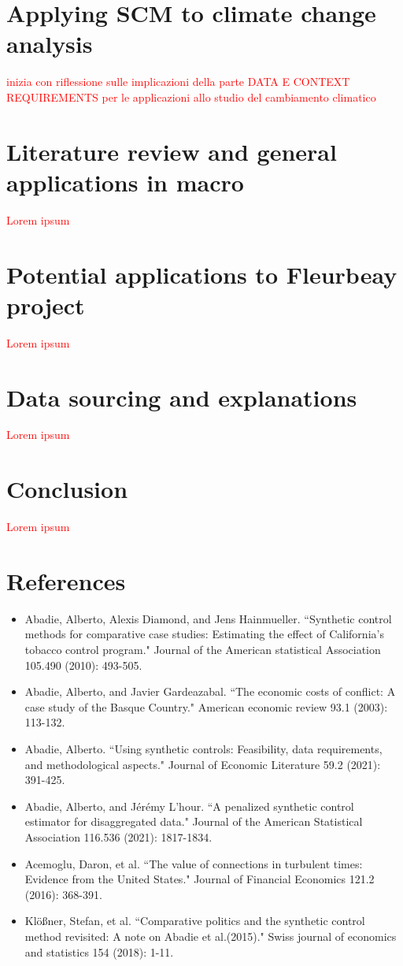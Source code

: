\documentclass[12pt,a4paper,draft]{article}
\begin{document}
\section{Applying SCM to climate change analysis}
\textcolor{red}{inizia con riflessione sulle implicazioni della parte DATA E CONTEXT
REQUIREMENTS per le applicazioni allo studio del cambiamento climatico}


\section{Literature review and general applications in macro}
\textcolor{red}{Lorem ipsum}




\section{Potential applications to Fleurbeay project}
\textcolor{red}{Lorem ipsum}




\section{Data sourcing and explanations}
\textcolor{red}{Lorem ipsum}




\section{Conclusion}
\textcolor{red}{Lorem ipsum}


\newpage
\section{References}
\begin{itemize}
    \item Abadie, Alberto, Alexis Diamond, and Jens Hainmueller. ``Synthetic control methods for comparative case studies: Estimating the effect of California's tobacco control program." Journal of the American statistical Association 105.490 (2010): 493-505.
    \item Abadie, Alberto, and Javier Gardeazabal. ``The economic costs of conflict: A case study of the Basque Country." American economic review 93.1 (2003): 113-132.
    \item Abadie, Alberto. ``Using synthetic controls: Feasibility, data requirements, and methodological aspects." Journal of Economic Literature 59.2 (2021): 391-425.
    \item Abadie, Alberto, and Jérémy L’hour. ``A penalized synthetic control estimator for disaggregated data." Journal of the American Statistical Association 116.536 (2021): 1817-1834.
    \item Acemoglu, Daron, et al. ``The value of connections in turbulent times: Evidence from the United States." Journal of Financial Economics 121.2 (2016): 368-391.
    \item Klößner, Stefan, et al. ``Comparative politics and the synthetic control method revisited: A note on Abadie et al.(2015)." Swiss journal of economics and statistics 154 (2018): 1-11.
\end{itemize}
\end{document}

